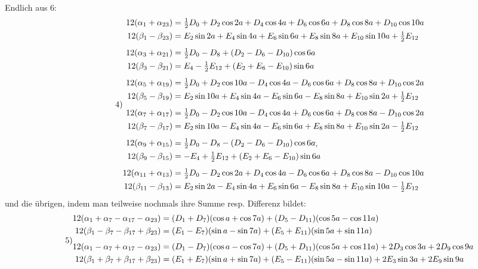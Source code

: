 \begin{landscape}
\[\begin{aligned}
\end{aligned}
\]
\clearpage{}
\par\noindent\hspace*{\parindent}Endlich aus 6:
\[
\tag*{4)}
\begin{aligned}
12(\alpha_1+\alpha_{23})&=\tfrac12 D_0+D_2\cos2a+D_4\cos4a+D_6\cos6a+D_8\cos8a+D_{10}\cos10a\\
12(\beta_1-\beta_{23})&=E_2\sin2a+E_4\sin4a+E_6\sin6a+E_8\sin8a+E_{10}\sin10a+\tfrac12 E_{12}\\[4pt]
12(\alpha_3+\alpha_{21})&=\tfrac12 D_0-D_8+(D_2-D_6-D_{10})\cos6a\\
12(\beta_3-\beta_{21})&=E_4-\tfrac12 E_{12}+(E_2+E_6-E_{10})\sin6a\\[4pt]
12(\alpha_5+\alpha_{19})&=\tfrac12 D_0+D_2\cos10a-D_4\cos4a-D_6\cos6a+D_8\cos8a+D_{10}\cos2a\\
12(\beta_5-\beta_{19})&=E_2\sin10a+E_4\sin4a-E_6\sin6a-E_8\sin8a+E_{10}\sin2a+\tfrac12 E_{12}\\[4pt]
12(\alpha_7+\alpha_{17})&=\tfrac12 D_0-D_2\cos10a-D_4\cos4a+D_6\cos6a+D_8\cos8a-D_{10}\cos2a\\
12(\beta_7-\beta_{17})&=E_2\sin10a-E_4\sin4a-E_6\sin6a+E_8\sin8a+E_{10}\sin2a-\tfrac12 E_{12}\\[4pt]
12(\alpha_9+\alpha_{15})&=\tfrac12 D_0-D_8-(D_2-D_6-D_{10})\cos6a\VthreeTerminalPair\\
12(\beta_9-\beta_{15})&=-E_4+\tfrac12 E_{12}+(E_2+E_6-E_{10})\sin6a\\[4pt]
12(\alpha_{11}+\alpha_{13})&=\tfrac12 D_0-D_2\cos2a+D_4\cos4a-D_6\cos6a+D_8\cos8a-D_{10}\cos10a\\
12(\beta_{11}-\beta_{13})&=E_2\sin2a-E_4\sin4a+E_6\sin6a-E_8\sin8a+E_{10}\sin10a-\tfrac12 E_{12}
\end{aligned}
\]
und die übrigen, indem man teilweise nochmals ihre Summe resp. Differenz bildet:
\[
\tag*{5)}
\begin{aligned}
12(\alpha_1+\alpha_7-\alpha_{17}-\alpha_{23})&=\VthreeLowDash(D_1+D_7)(\cos a+\cos7a)+(D_5-D_{11})(\cos5a-\cos11a)\\
12(\beta_1-\beta_7-\beta_{17}+\beta_{23})&=(E_1-E_7)(\sin a-\sin7a)+(E_5+E_{11})(\sin5a+\sin11a)\\[4pt]
12(\alpha_1-\alpha_7+\alpha_{17}-\alpha_{23})&=(D_1-D_7)(\cos a-\cos7a)+(D_5+D_{11})(\cos5a+\cos11a)+2D_3\cos3a+2D_9\cos9a\\
12(\beta_1+\beta_7+\beta_{17}+\beta_{23})&=(E_1+E_7)(\sin a+\sin7a)+(E_5-E_{11})(\sin5a-\sin11a)+2E_3\sin3a+2E_9\sin9a\\[4pt]

\end{aligned}\]
\end{landscape}
